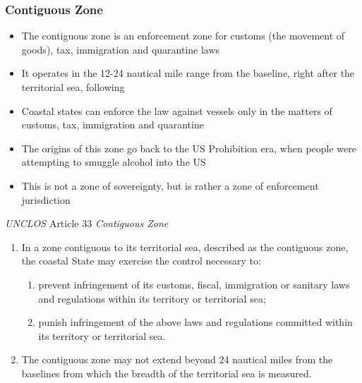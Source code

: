 \subsubsection{Contiguous Zone}
\begin{itemize}
    \item The contiguous zone is an enforcement zone for customs (the movement of goods), tax, immigration and quarantine laws
    \item It operates in the 12-24 nautical mile range from the baseline, right after the territorial sea, following 
    \item Coastal states can enforce the law against vessels only in the matters of customs, tax, immigration and quarantine
    \item The origins of this zone go back to the US Prohibition era, when people were attempting to smuggle alcohol into the US
    \item This is not a zone of sovereignty, but is rather a zone of enforcement jurisdiction
\end{itemize}

\begin{conventiondetails}{\textit{UNCLOS} Article 33}
    \flushleft
    \textit{Contiguous Zone}
    \begin{enumerate}
        \item In a zone contiguous to its territorial sea, described as the contiguous zone, the coastal State may exercise the control necessary to:
        \begin{enumerate}[label=(\alph*)]
            \item prevent infringement of its customs, fiscal, immigration or sanitary laws and regulations within its territory or territorial sea;
            \item punish infringement of the above laws and regulations committed within its territory or territorial sea.
        \end{enumerate}
        \item The contiguous zone may not extend beyond 24 nautical miles from the baselines from which the breadth of the territorial sea is measured.        
    \end{enumerate}
    
\end{conventiondetails}

